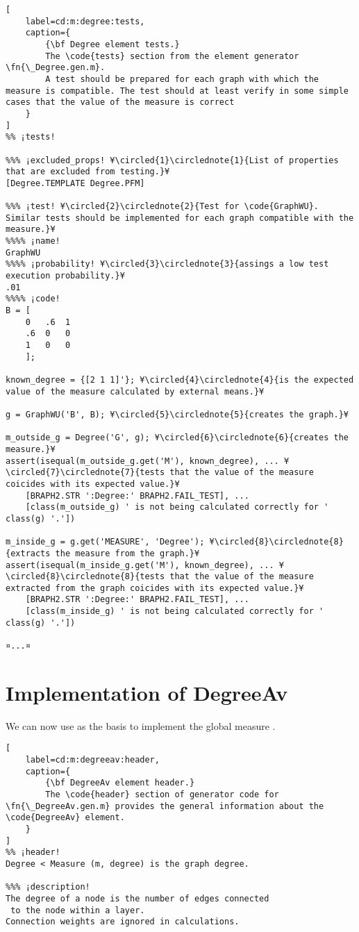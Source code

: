 \documentclass{tufte-handout}
\begin{document}
\begin{lstlisting}[
	label=cd:m:degree:tests,
	caption={
		{\bf Degree element tests.}
		The \code{tests} section from the element generator \fn{\_Degree.gen.m}.
		A test should be prepared for each graph with which the measure is compatible. The test should at least verify in some simple cases that the value of the measure is correct 
	}
]
%% ¡tests!

%%% ¡excluded_props! ¥\circled{1}\circlednote{1}{List of properties that are excluded from testing.}¥
[Degree.TEMPLATE Degree.PFM] 

%%% ¡test! ¥\circled{2}\circlednote{2}{Test for \code{GraphWU}. Similar tests should be implemented for each graph compatible with the measure.}¥
%%%% ¡name!
GraphWU
%%%% ¡probability! ¥\circled{3}\circlednote{3}{assings a low test execution probability.}¥
.01
%%%% ¡code!
B = [
    0   .6  1
    .6  0   0
    1   0   0
    ];

known_degree = {[2 1 1]'}; ¥\circled{4}\circlednote{4}{is the expected value of the measure calculated by external means.}¥

g = GraphWU('B', B); ¥\circled{5}\circlednote{5}{creates the graph.}¥

m_outside_g = Degree('G', g); ¥\circled{6}\circlednote{6}{creates the measure.}¥
assert(isequal(m_outside_g.get('M'), known_degree), ... ¥\circled{7}\circlednote{7}{tests that the value of the measure coicides with its expected value.}¥ 
    [BRAPH2.STR ':Degree:' BRAPH2.FAIL_TEST], ...
    [class(m_outside_g) ' is not being calculated correctly for ' class(g) '.'])

m_inside_g = g.get('MEASURE', 'Degree'); ¥\circled{8}\circlednote{8}{extracts the measure from the graph.}¥
assert(isequal(m_inside_g.get('M'), known_degree), ... ¥\circled{8}\circlednote{8}{tests that the value of the measure extracted from the graph coicides with its expected value.}¥
    [BRAPH2.STR ':Degree:' BRAPH2.FAIL_TEST], ...
    [class(m_inside_g) ' is not being calculated correctly for ' class(g) '.'])

¤...¤
\end{lstlisting}

\section{Implementation of DegreeAv}

We can now use  as the basis to implement the global measure .

\begin{lstlisting}[
	label=cd:m:degreeav:header,
	caption={
		{\bf DegreeAv element header.}
		The \code{header} section of generator code for \fn{\_DegreeAv.gen.m} provides the general information about the \code{DegreeAv} element.
	}
]
%% ¡header!
Degree < Measure (m, degree) is the graph degree.

%%% ¡description!
The degree of a node is the number of edges connected 
 to the node within a layer. 
Connection weights are ignored in calculations.
\end{lstlisting}
\end{document}
